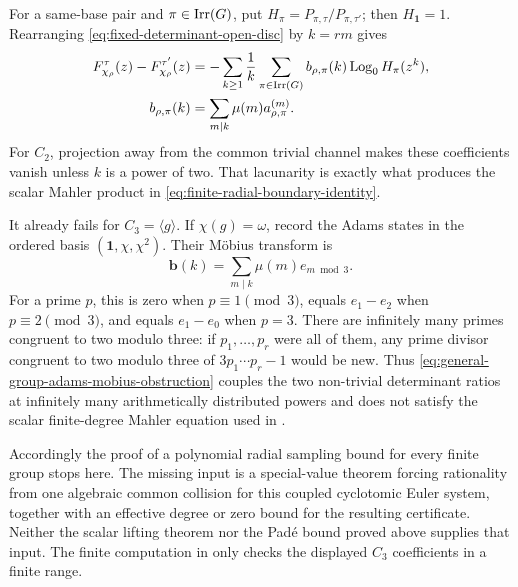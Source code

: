 \begin{remark}
\label{rem:general-group-finite-sampling-interface}
For a same-base pair and \(\pi\in\operatorname{Irr}(G)\), put
\(H_\pi=P_{\pi,\tau}/P_{\pi,\tau'}\); then \(H_{\mathbf1}=1\).
Rearranging \eqref{eq:fixed-determinant-open-disc} by \(k=rm\) gives
\begin{equation}\label{eq:general-group-adams-mobius-obstruction}
 \begin{aligned}
 F_{\chi_\rho}^\tau(z)-F_{\chi_\rho}^{\tau'}(z)
   &=-\sum_{k\ge1}\frac1k\sum_{\pi\in\operatorname{Irr}(G)}
       b_{\rho,\pi}(k)\operatorname{Log}_0H_\pi(z^k),\\
 b_{\rho,\pi}(k)
   &=\sum_{m\mid k}\mu(m)a_{\rho,\pi}^{(m)}.
 \end{aligned}
\end{equation}
For \(C_2\), projection away from the common trivial channel makes these
coefficients vanish unless \(k\) is a power of two.  That lacunarity is exactly
what produces the scalar Mahler product in
\eqref{eq:finite-radial-boundary-identity}.

It already fails for \(C_3=\langle g\rangle\).  If \(\chi(g)=\omega\), record
the Adams states in the ordered basis
\((\mathbf1,\chi,\chi^2)\).  Their M\"obius transform is
\[
 \mathbf b(k)=\sum_{m\mid k}\mu(m)e_{m\bmod3}.
\]
For a prime \(p\), this is zero when \(p\equiv1\pmod3\), equals
\(e_1-e_2\) when \(p\equiv2\pmod3\), and equals \(e_1-e_0\) when
\(p=3\).  There are infinitely many primes congruent to two modulo three:
if \(p_1,\ldots,p_r\) were all of them, any prime divisor congruent to two
modulo three of \(3p_1\cdots p_r-1\) would be new.  Thus
\eqref{eq:general-group-adams-mobius-obstruction} couples the two non-trivial
determinant ratios at infinitely many arithmetically distributed powers and
does not satisfy the scalar finite-degree Mahler equation used in
.

Accordingly the proof of a polynomial radial sampling bound for every finite
group stops here.  The missing input is a special-value theorem forcing
rationality from one algebraic common collision for this coupled cyclotomic
Euler system, together with an effective degree or zero bound for the resulting
certificate.  Neither the scalar lifting theorem nor the Pad\'e bound proved
above supplies that input.  The finite computation in
 only checks the displayed \(C_3\) coefficients in a
finite range.
\end{remark}

